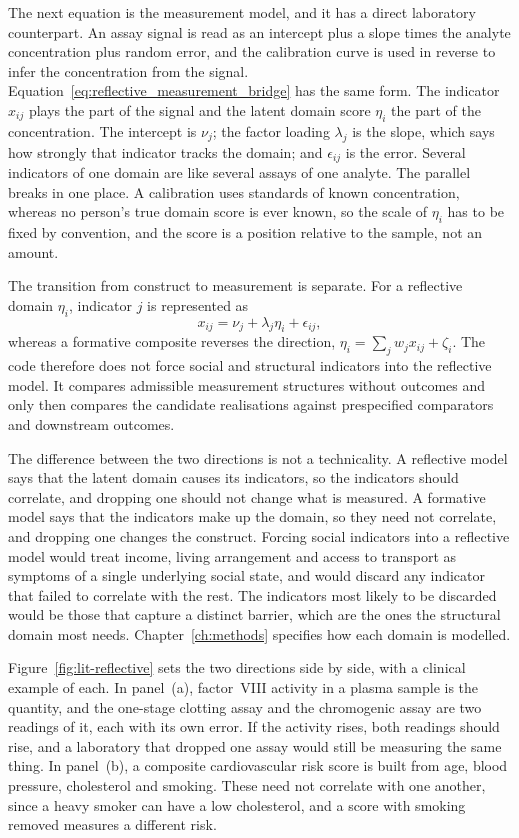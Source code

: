 The next equation is the measurement model, and it has a direct laboratory counterpart. An assay signal is read as an intercept plus a slope times the analyte concentration plus random error, and the calibration curve is used in reverse to infer the concentration from the signal. Equation~\eqref{eq:reflective_measurement_bridge} has the same form. The indicator $x_{ij}$ plays the part of the signal and the latent domain score $\eta_i$ the part of the concentration. The intercept is $\nu_j$; the factor loading $\lambda_j$ is the slope, which says how strongly that indicator tracks the domain; and $\epsilon_{ij}$ is the error. Several indicators of one domain are like several assays of one analyte. The parallel breaks in one place. A calibration uses standards of known concentration, whereas no person's true domain score is ever known, so the scale of $\eta_i$ has to be fixed by convention, and the score is a position relative to the sample, not an amount.

The transition from construct to measurement is separate. For a reflective
domain $\eta_i$, indicator $j$ is represented as \citep{bollen_1989,kline_2015}
\begin{equation}
x_{ij}=\nu_j+\lambda_j\eta_i+\epsilon_{ij},
\label{eq:reflective_measurement_bridge}
\end{equation}
whereas a formative composite reverses the direction,
$\eta_i=\sum_j w_jx_{ij}+\zeta_i$. The code therefore does not force social
and structural indicators into the reflective model. It compares admissible
measurement structures without outcomes and only then compares the candidate
realisations against prespecified comparators and downstream outcomes.

The difference between the two directions is not a technicality. A reflective
model says that the latent domain causes its indicators, so the indicators
should correlate, and dropping one should not change what is measured. A
formative model says that the indicators make up the domain, so they need not
correlate, and dropping one changes the construct. Forcing social indicators
into a reflective model would treat income, living arrangement and access to
transport as symptoms of a single underlying social state, and would discard
any indicator that failed to correlate with the rest. The indicators most
likely to be discarded would be those that capture a distinct barrier, which
are the ones the structural domain most needs. Chapter~\ref{ch:methods}
specifies how each domain is modelled.

Figure~\ref{fig:lit-reflective} sets the two directions side by side, with a clinical example of each. In panel~(a), factor~VIII activity in a plasma sample is the quantity, and the one-stage clotting assay and the chromogenic assay are two readings of it, each with its own error. If the activity rises, both readings should rise, and a laboratory that dropped one assay would still be measuring the same thing. In panel~(b), a composite cardiovascular risk score is built from age, blood pressure, cholesterol and smoking. These need not correlate with one another, since a heavy smoker can have a low cholesterol, and a score with smoking removed measures a different risk.

